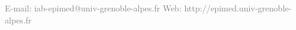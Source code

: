 \documentclass[final]{beamer}
\newlength{\twocolwid}
\begin{document}
\begin{frame}[t]
\begin{columns}[t]
\begin{column}{\twocolwid}

\end{column} %

\end{columns} %

\begin{center}
\textcolor{gray}{E-mail: iab-epimed@univ-grenoble-alpes.fr \hspace{5cm} Web: http://epimed.univ-grenoble-alpes.fr}
\end{center}

\end{frame} %
\end{document}
